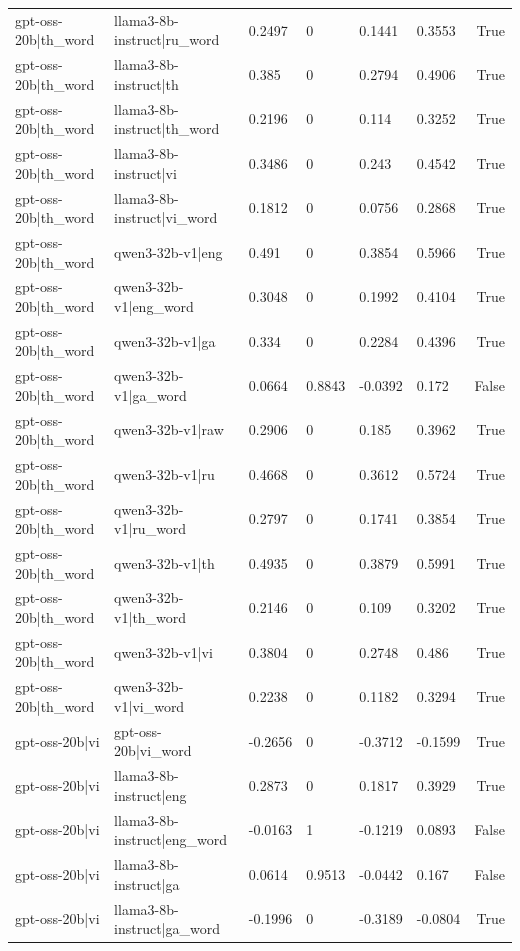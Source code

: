 \begin{table}
\begin{tabular}{llllllr}
gpt-oss-20b|th_word & llama3-8b-instruct|ru_word & 0.2497 & 0 & 0.1441 & 0.3553 & True \\
gpt-oss-20b|th_word & llama3-8b-instruct|th & 0.385 & 0 & 0.2794 & 0.4906 & True \\
gpt-oss-20b|th_word & llama3-8b-instruct|th_word & 0.2196 & 0 & 0.114 & 0.3252 & True \\
gpt-oss-20b|th_word & llama3-8b-instruct|vi & 0.3486 & 0 & 0.243 & 0.4542 & True \\
gpt-oss-20b|th_word & llama3-8b-instruct|vi_word & 0.1812 & 0 & 0.0756 & 0.2868 & True \\
gpt-oss-20b|th_word & qwen3-32b-v1|eng & 0.491 & 0 & 0.3854 & 0.5966 & True \\
gpt-oss-20b|th_word & qwen3-32b-v1|eng_word & 0.3048 & 0 & 0.1992 & 0.4104 & True \\
gpt-oss-20b|th_word & qwen3-32b-v1|ga & 0.334 & 0 & 0.2284 & 0.4396 & True \\
gpt-oss-20b|th_word & qwen3-32b-v1|ga_word & 0.0664 & 0.8843 & -0.0392 & 0.172 & False \\
gpt-oss-20b|th_word & qwen3-32b-v1|raw & 0.2906 & 0 & 0.185 & 0.3962 & True \\
gpt-oss-20b|th_word & qwen3-32b-v1|ru & 0.4668 & 0 & 0.3612 & 0.5724 & True \\
gpt-oss-20b|th_word & qwen3-32b-v1|ru_word & 0.2797 & 0 & 0.1741 & 0.3854 & True \\
gpt-oss-20b|th_word & qwen3-32b-v1|th & 0.4935 & 0 & 0.3879 & 0.5991 & True \\
gpt-oss-20b|th_word & qwen3-32b-v1|th_word & 0.2146 & 0 & 0.109 & 0.3202 & True \\
gpt-oss-20b|th_word & qwen3-32b-v1|vi & 0.3804 & 0 & 0.2748 & 0.486 & True \\
gpt-oss-20b|th_word & qwen3-32b-v1|vi_word & 0.2238 & 0 & 0.1182 & 0.3294 & True \\
gpt-oss-20b|vi & gpt-oss-20b|vi_word & -0.2656 & 0 & -0.3712 & -0.1599 & True \\
gpt-oss-20b|vi & llama3-8b-instruct|eng & 0.2873 & 0 & 0.1817 & 0.3929 & True \\
gpt-oss-20b|vi & llama3-8b-instruct|eng_word & -0.0163 & 1 & -0.1219 & 0.0893 & False \\
gpt-oss-20b|vi & llama3-8b-instruct|ga & 0.0614 & 0.9513 & -0.0442 & 0.167 & False \\
gpt-oss-20b|vi & llama3-8b-instruct|ga_word & -0.1996 & 0 & -0.3189 & -0.0804 & True \\

\end{tabular}
\end{table}
